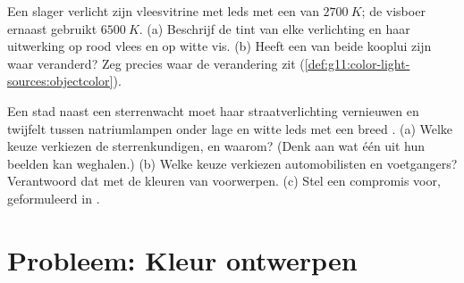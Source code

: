 \begin{exercise}[$\star\star\star$]\label{exo:g11:color-light-sources:14}
Een slager verlicht zijn vleesvitrine met leds met een 
van $\qty{2700}{K}$; de visboer ernaast gebruikt $\qty{6500}{K}$.
(a) Beschrijf de tint van elke verlichting en haar uitwerking op rood
vlees en op witte vis. (b) Heeft een van beide kooplui zijn waar
veranderd? Zeg precies waar de verandering zit
(\cref{def:g11:color-light-sources:objectcolor}).
\end{exercise}

\begin{exercise}[$\star\star\star$]\label{exo:g11:color-light-sources:15}
Een stad naast een sterrenwacht moet haar straatverlichting vernieuwen en
twijfelt tussen natriumlampen onder lage  en witte leds met een breed
. (a) Welke keuze verkiezen de sterrenkundigen, en waarom? (Denk
aan wat één  uit hun beelden kan weghalen.) (b) Welke keuze
verkiezen automobilisten en voetgangers? Verantwoord dat met de kleuren
van voorwerpen. (c) Stel een compromis voor, geformuleerd in
.
\end{exercise}

\section{Probleem: Kleur ontwerpen}

